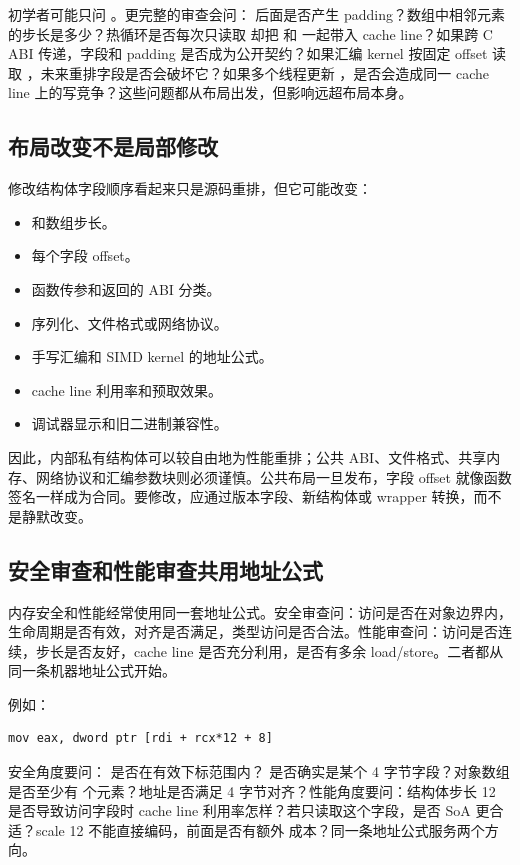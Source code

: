 初学者可能只问 。更完整的审查会问： 后面是否产生 padding？数组中相邻元素的步长是多少？热循环是否每次只读取  却把  和  一起带入 cache line？如果跨 C ABI 传递，字段和 padding 是否成为公开契约？如果汇编 kernel 按固定 offset 读取 ，未来重排字段是否会破坏它？如果多个线程更新 ，是否会造成同一 cache line 上的写竞争？这些问题都从布局出发，但影响远超布局本身。

\subsection{布局改变不是局部修改}

修改结构体字段顺序看起来只是源码重排，但它可能改变：

\begin{itemize}
  \item {} 和数组步长。
  \item 每个字段 offset。
  \item 函数传参和返回的 ABI 分类。
  \item 序列化、文件格式或网络协议。
  \item 手写汇编和 SIMD kernel 的地址公式。
  \item cache line 利用率和预取效果。
  \item 调试器显示和旧二进制兼容性。
\end{itemize}

因此，内部私有结构体可以较自由地为性能重排；公共 ABI、文件格式、共享内存、网络协议和汇编参数块则必须谨慎。公共布局一旦发布，字段 offset 就像函数签名一样成为合同。要修改，应通过版本字段、新结构体或 wrapper 转换，而不是静默改变。

\subsection{安全审查和性能审查共用地址公式}

内存安全和性能经常使用同一套地址公式。安全审查问：访问是否在对象边界内，生命周期是否有效，对齐是否满足，类型访问是否合法。性能审查问：访问是否连续，步长是否友好，cache line 是否充分利用，是否有多余 load/store。二者都从同一条机器地址公式开始。

例如：

\begin{lstlisting}
mov eax, dword ptr [rdi + rcx*12 + 8]
\end{lstlisting}

安全角度要问： 是否在有效下标范围内？ 是否确实是某个 4 字节字段？对象数组是否至少有  个元素？地址是否满足 4 字节对齐？性能角度要问：结构体步长 12 是否导致访问字段时 cache line 利用率怎样？若只读取这个字段，是否 SoA 更合适？scale 12 不能直接编码，前面是否有额外  成本？同一条地址公式服务两个方向。


